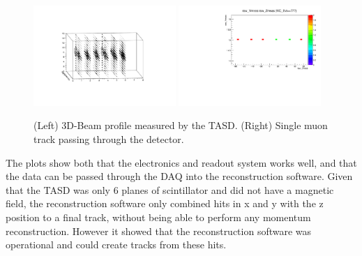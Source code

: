 \begin{figure}[h!]
\centering
\includegraphics[width=0.48\textwidth,trim = 5cm 5cm 5cm 5cm]{figures/nuphys/newFigures/beamPlot.pdf}
\includegraphics[width=0.48\textwidth]{figures/nuphys/newFigures/muonTrackYZ.pdf}
\caption{(Left) 3D-Beam profile measured by the TASD. (Right) Single muon track passing through the detector.}
\label{fig:TASDres1}
\end{figure}



The plots show both that the electronics and readout system works well, and that the data can be passed through the DAQ into the reconstruction software. Given that the TASD was only 6 planes of scintillator and did not have a magnetic field, the reconstruction software only combined hits in x and y with the z position to a final track, without being able to perform any momentum reconstruction. However it showed that the reconstruction software was operational and could create tracks from these hits.



